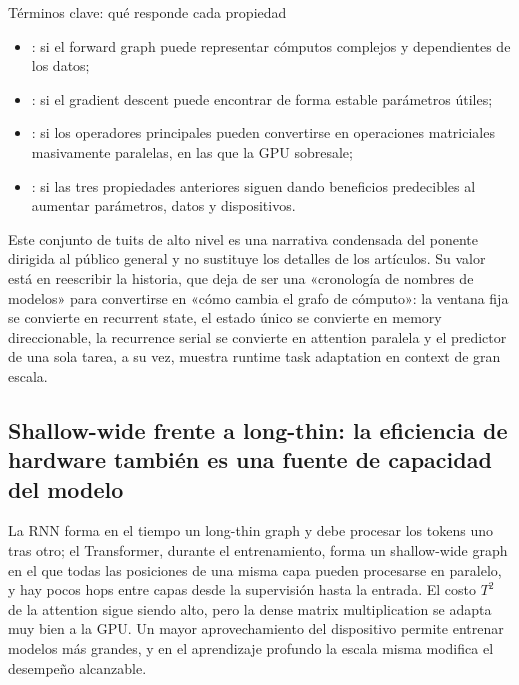\begin{knowledgebox}{Términos clave: qué responde cada propiedad}
\begin{itemize}
  \item {}: si el forward graph puede representar cómputos complejos y dependientes de los datos;
  \item {}: si el gradient descent puede encontrar de forma estable parámetros útiles;
  \item {}: si los operadores principales pueden convertirse en operaciones matriciales masivamente paralelas, en las que la GPU sobresale;
  \item {}: si las tres propiedades anteriores siguen dando beneficios predecibles al aumentar parámetros, datos y dispositivos.
\end{itemize}
\end{knowledgebox}


Este conjunto de tuits de alto nivel es una narrativa condensada del ponente dirigida al público general y no sustituye los detalles de los artículos. Su valor está en reescribir la historia, que deja de ser una «cronología de nombres de modelos» para convertirse en «cómo cambia el grafo de cómputo»: la ventana fija se convierte en recurrent state, el estado único se convierte en memory direccionable, la recurrence serial se convierte en attention paralela y el predictor de una sola tarea, a su vez, muestra runtime task adaptation en context de gran escala.

\subsection{Shallow-wide frente a long-thin: la eficiencia de hardware también es una fuente de capacidad del modelo}

La RNN forma en el tiempo un long-thin graph y debe procesar los tokens uno tras otro; el Transformer, durante el entrenamiento, forma un shallow-wide graph en el que todas las posiciones de una misma capa pueden procesarse en paralelo, y hay pocos hops entre capas desde la supervisión hasta la entrada. El costo $T^2$ de la attention sigue siendo alto, pero la dense matrix multiplication se adapta muy bien a la GPU. Un mayor aprovechamiento del dispositivo permite entrenar modelos más grandes, y en el aprendizaje profundo la escala misma modifica el desempeño alcanzable.

